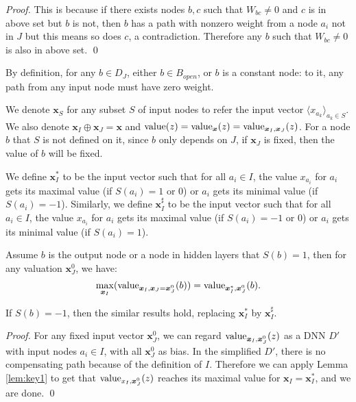 				\begin{proof}
					This is because if there exists nodes $b,c$ such that $W_{bc}\neq 0$ and $c$ is in above set but $b$ is not, then $b$ has a path with nonzero weight from a node $a_i$ not in $J$ but this means so does $c$, a contradiction. Therefore any $b$ such that $W_{bc}\neq 0$ is also in above set. \qed
				\end{proof}
				
				By definition, for any $b\in D_J$, either $b\in B_{open}$, or $b$ is a constant node: to it, any path from any input node must have zero weight.
				
				We denote $\boldsymbol{x}_S$ for any subset $S$ of input nodes to refer the input vector $\langle x_{a_k}\rangle_{a_k\in S}$. We also denote $\boldsymbol{x}_I\oplus \boldsymbol{x}_J = \boldsymbol{x}$ and ${\textrm{value}}(z)={\textrm{value}}_{\boldsymbol{x}}(z)={\textrm{value}}_{\boldsymbol{x}_I,\boldsymbol{x}_J} (z)$. For a node $b$ that $S$ is not defined on it, since $b$ only depends on $J$, if $\boldsymbol{x}_J$ is fixed, then the value of $b$ will be fixed.
				
				We define $\boldsymbol{x}_I^*$ to be the input vector such that for all $a_i \in I$, the value $x_{a_i}$ for $a_i$ gets its maximal value (if $S(a_i)=1$ or $0$) or $a_i$ gets its minimal value (if $S(a_i)=-1$). Similarly, we define $\boldsymbol{x}_I^\sharp$ to be the input vector such that for all $a_i \in I$, the value $x_{a_i}$ for $a_i$ gets its maximal value (if $S(a_i)=-1$ or $0$) or $a_i$ gets its minimal value (if $S(a_i)=1$).
				
				
				
				\begin{lemma} \label{lem:reach_max_2}
					
					Assume $b$ is the output node or a node in hidden layers that $S(b)=1$, then   for any valuation $\boldsymbol{x}^0_J$, 
						we have: $$\max_{\boldsymbol{x}_I} ({\textrm{value}}_{\boldsymbol{x}_I,\boldsymbol{x}_J=\boldsymbol{x}^0_J}(b)) =  {\textrm{value}}_{\boldsymbol{x}_I^*,\boldsymbol{x}^0_J}(b).$$

				
					
					
					
					If $S(b)=-1$, then the similar results hold, replacing $\boldsymbol{x}^*_I$ by $\boldsymbol{x}^\sharp_I$. 
				\end{lemma}
				
				\begin{proof}
				
					
					For any fixed input vector $\boldsymbol{x}^0_J$, we can regard ${\textrm{value}}_{\boldsymbol{x}_I,\boldsymbol{x}^0_J}(z)$ as a DNN $D'$ with input nodes $a_i\in I$, with all $\boldsymbol{x}^0_J$ %
					as bias. In the simplified $D'$, there is no compensating path because of the definition of $I$. Therefore we can apply Lemma \ref{lem:key1} to get that ${\textrm{value}}_{x_I,\boldsymbol{x}^0_J}(z)$ reaches its maximal value for $\boldsymbol{x}_I=\boldsymbol{x}_I^*$, and we are done. \qed
				\end{proof}
				
